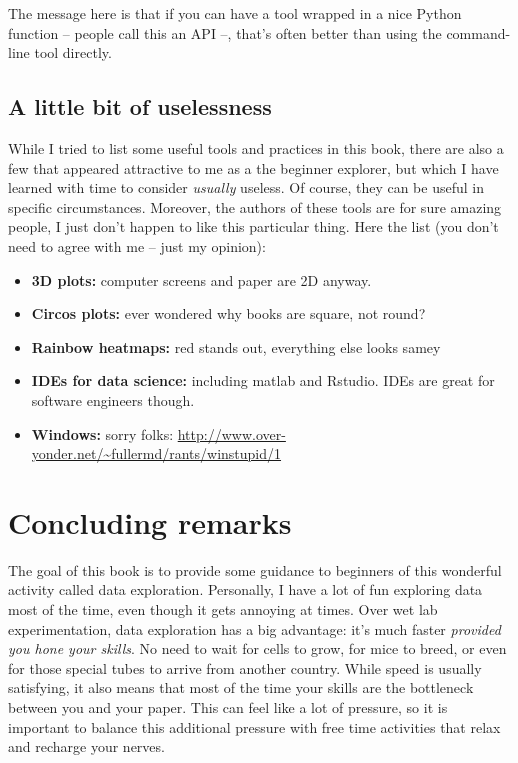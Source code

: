 \documentclass[12pt,a4paper,notitlepage,onecolumn]{article}
\begin{document}
The message here is that if you can have a tool wrapped in a nice Python function -- people call this an API --, that's often better than using the command-line tool directly.

\subsection{A little bit of uselessness}
While I tried to list some useful tools and practices in this book, there are also a few that appeared attractive to me as a the beginner explorer, but which I have learned with time to consider \textit{usually} useless. Of course, they can be useful in specific circumstances. Moreover, the authors of these tools are for sure amazing people, I just don't happen to like this particular thing. Here the list (you don't need to agree with me -- just my opinion):

\begin{itemize}
\item \textbf{3D plots:} computer screens and paper are 2D anyway.
\item \textbf{Circos plots:} ever wondered why books are square, not round?
\item \textbf{Rainbow heatmaps:} red stands out, everything else looks samey
\item \textbf{IDEs for data science:} including matlab and Rstudio. IDEs are great for software engineers though.
\item \textbf{Windows:} sorry folks: \url{http://www.over-yonder.net/~fullermd/rants/winstupid/1}
\end{itemize}

\section{Concluding remarks}
The goal of this book is to provide some guidance to beginners of this wonderful activity called data exploration. Personally, I have a lot of fun exploring data most of the time, even though it gets annoying at times. Over wet lab experimentation, data exploration has a big advantage: it's much faster \textit{provided you hone your skills}. No need to wait for cells to grow, for mice to breed, or even for those special tubes to arrive from another country. While speed is usually satisfying, it also means that most of the time your skills are the bottleneck between you and your paper. This can feel like a lot of pressure, so it is important to balance this additional pressure with free time activities that relax and recharge your nerves.
\end{document}
